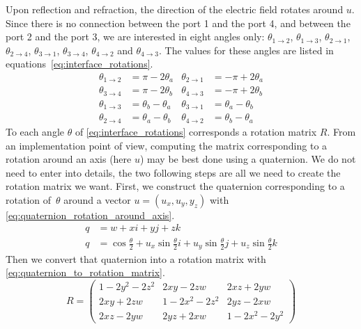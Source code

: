Upon reflection and refraction, the direction of the electric field rotates around $u$.
Since there is no connection between the port 1 and the port 4, and between the port 2 and the port 3, we are interested in eight angles only: $\theta_{1 \rightarrow 2}$, $\theta_{1 \rightarrow 3}$, $\theta_{2 \rightarrow 1}$, $\theta_{2 \rightarrow 4}$, $\theta_{3 \rightarrow 1}$, $\theta_{3 \rightarrow 4}$, $\theta_{4 \rightarrow 2}$ and $\theta_{4 \rightarrow 3}$.
The values for these angles are listed in equations~\cref{eq:interface_rotations}.
\begin{equation}
    \begin{aligned}
        \theta_{1 \rightarrow 2} &= \pi - 2\theta_a
        &
        \theta_{2 \rightarrow 1} &= -\pi + 2\theta_a
        \\
        \theta_{3 \rightarrow 4} &= \pi - 2\theta_b
        &
        \theta_{4 \rightarrow 3} &= -\pi + 2\theta_b
        \\
        \theta_{1 \rightarrow 3} &= \theta_b - \theta_a
        &
        \theta_{3 \rightarrow 1} &= \theta_a - \theta_b
        \\
        \theta_{2 \rightarrow 4} &= \theta_a - \theta_b
        &
        \theta_{4 \rightarrow 2} &= \theta_b - \theta_a
    \end{aligned}
    \label{eq:interface_rotations}
\end{equation}
To each angle $\theta$ of \cref{eq:interface_rotations} corresponds a rotation matrix $R$.
From an implementation point of view, computing the matrix corresponding to a rotation around an axis (here $u$) may be best done using a quaternion.
We do not need to enter into details, the two following steps are all we need to create the rotation matrix we want.
First, we construct the quaternion corresponding to a rotation of~$\theta$ around a vector $u=(u_x, u_y, y_z)$ with \cref{eq:quaternion_rotation_around_axis}.
\begin{equation}
    \begin{aligned}
        q &= w + xi + yj + zk
        \\
        q &= \cos \frac{\theta}{2}
           + u_x \sin \frac{\theta}{2} i
           + u_y \sin \frac{\theta}{2} j
           + u_z \sin \frac{\theta}{2} k
    \end{aligned}
    \label{eq:quaternion_rotation_around_axis}
\end{equation}
Then we convert that quaternion into a rotation matrix with \cref{eq:quaternion_to_rotation_matrix}.
\begin{equation}
    R =
    \begin{pmatrix}
        1 - 2y^2 - 2z^2   &   2xy - 2zw         &   2xz + 2yw \\
        2xy + 2zw         &   1 - 2x^2 - 2z^2   &   2yz - 2xw \\
        2xz - 2yw         &   2yz + 2xw         &   1 - 2x^2 - 2y^2
    \end{pmatrix}
    \label{eq:quaternion_to_rotation_matrix}
\end{equation}

